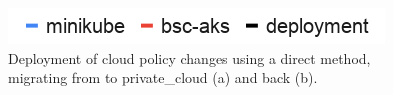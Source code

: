 \documentclass[../main.tex]{subfiles}
\begin{document}
    \begin{figure}[ht]
        \centering
        \includegraphics[width=.4\linewidth]{img/res-deploy-label.png}
        \captionsetup{justification=centering}
        \caption{
            Deployment of \gls{cloud} policy changes using a direct method, migrating from  to \gls{private_cloud} (a) and back (b).
        }
        \label{fig:res_deploy_direct}
    \end{figure}
\end{document}
